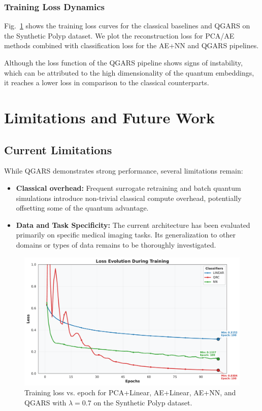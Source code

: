 \documentclass[conference]{IEEEtran}
\begin{document}
\subsubsection{Training Loss Dynamics}

Fig.~\ref{fig:loss_curves} shows the training loss curves for the classical baselines and QGARS on the Synthetic Polyp dataset. We plot the reconstruction loss for PCA/AE methods combined with classification loss for the AE+NN and QGARS pipelines.



\noindent
Although the loss function of the QGARS pipeline shows signs of instability, which can be attributed to the high dimensionality of the quantum embeddings, it reaches a lower loss in comparison to the classical counterparts.

\section{Limitations and Future Work}
\subsection{Current Limitations}
While QGARS demonstrates strong performance, several limitations remain:
\begin{itemize}
    \item \textbf{Classical overhead:}  
    Frequent surrogate retraining and batch quantum simulations introduce non-trivial classical compute overhead, potentially offsetting some of the quantum advantage.

    \item \textbf{Data and Task Specificity:}
    The current architecture has been evaluated primarily on specific medical imaging tasks. Its generalization to other domains or types of data remains to be thoroughly investigated.

\end{itemize}

\begin{figure}[!tb]
  \centering
  \includegraphics[width=\linewidth]{images/results/generated_polyp_dataset/classifier_losses.pdf}
  \caption{Training loss vs. epoch for PCA+Linear, AE+Linear, AE+NN, and QGARS with \( \lambda=0.7 \) on the Synthetic Polyp dataset.}
  \label{fig:loss_curves}
\end{figure}
\end{document}
